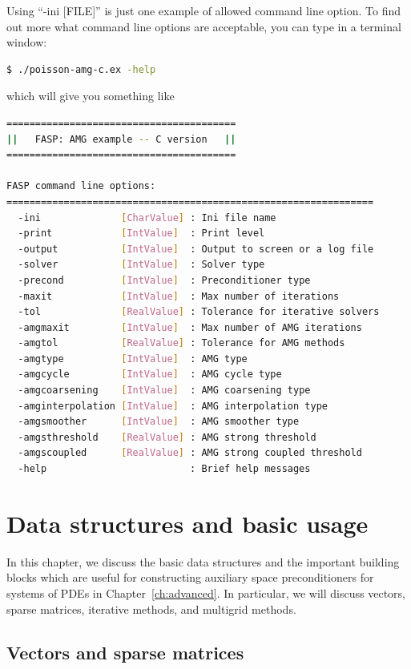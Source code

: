 \documentclass[11pt]{memoir}
\begin{document}
Using ``-ini [FILE]'' is just one example of allowed command line option. To find out more what command line options are acceptable, you can type in a terminal window:
%
\begin{lstlisting}[numbers=none,language=sh]
$ ./poisson-amg-c.ex -help
\end{lstlisting}
%
which will give you something like
%
\begin{lstlisting}[numbers=none,language=sh]
========================================
||   FASP: AMG example -- C version   ||
========================================

FASP command line options:
================================================================
  -ini              [CharValue] : Ini file name
  -print            [IntValue]  : Print level
  -output           [IntValue]  : Output to screen or a log file
  -solver           [IntValue]  : Solver type
  -precond          [IntValue]  : Preconditioner type
  -maxit            [IntValue]  : Max number of iterations
  -tol              [RealValue] : Tolerance for iterative solvers
  -amgmaxit         [IntValue]  : Max number of AMG iterations
  -amgtol           [RealValue] : Tolerance for AMG methods
  -amgtype          [IntValue]  : AMG type
  -amgcycle         [IntValue]  : AMG cycle type
  -amgcoarsening    [IntValue]  : AMG coarsening type
  -amginterpolation [IntValue]  : AMG interpolation type
  -amgsmoother      [IntValue]  : AMG smoother type
  -amgsthreshold    [RealValue] : AMG strong threshold
  -amgscoupled      [RealValue] : AMG strong coupled threshold
  -help                         : Brief help messages
 \end{lstlisting}
%

\chapter{Data structures and basic usage}\label{ch:basic}

In this chapter, we discuss the basic data structures and the
important building blocks which are useful for constructing auxiliary
space preconditioners for systems of PDEs in
Chapter~\ref{ch:advanced}. In particular, we will discuss vectors,
sparse matrices, iterative methods, and multigrid methods.

\section{Vectors and sparse matrices}\label{sec:blas}
\end{document}
